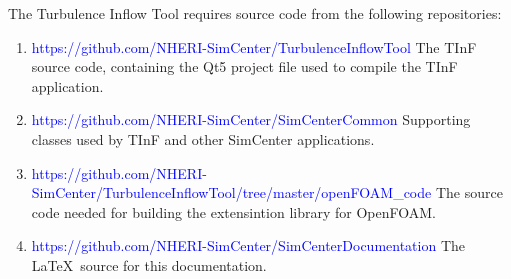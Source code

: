 \label{sec:TInFrequirements}

The Turbulence Inflow Tool requires source code from the following repositories:
\begin{enumerate}
\item \textcolor{blue}{https://github.com/NHERI-SimCenter/TurbulenceInflowTool}
    The TInF source code, containing the Qt5 project file used to compile the TInF application.
\item \textcolor{blue}{https://github.com/NHERI-SimCenter/SimCenterCommon}
    Supporting classes used by TInF and other SimCenter applications.
\item
\textcolor{blue}{https://github.com/NHERI-SimCenter/TurbulenceInflowTool/tree/master/openFOAM\_code}
    The source code needed for building the extensintion library for OpenFOAM.
\item \textcolor{blue}{https://github.com/NHERI-SimCenter/SimCenterDocumentation}
    The \LaTeX\ source for this documentation.
\end{enumerate}

